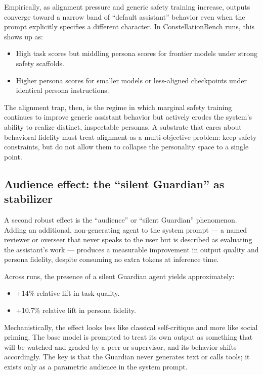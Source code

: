 Empirically, as alignment pressure and generic safety training increase,
outputs converge toward a narrow band of ``default assistant'' behavior
even when the prompt explicitly specifies a different character. In
ConstellationBench runs, this shows up as:

\begin{itemize}
\tightlist
\item
  High task scores but middling persona scores for frontier models under
  strong safety scaffolds.
\item
  Higher persona scores for smaller models or less-aligned checkpoints
  under identical persona instructions.
\end{itemize}

The alignment trap, then, is the regime in which marginal safety
training continues to improve generic assistant behavior but actively
erodes the system's ability to realize distinct, inspectable personas. A
substrate that cares about behavioral fidelity must treat alignment as a
multi-objective problem: keep safety constraints, but do not allow them
to collapse the personality space to a single point.

\subsection{Audience effect: the ``silent Guardian'' as
stabilizer}\label{audience-effect-the-silent-guardian-as-stabilizer}

A second robust effect is the ``audience'' or ``silent Guardian''
phenomenon. Adding an additional, non-generating agent to the system
prompt --- a named reviewer or overseer that never speaks to the user
but is described as evaluating the assistant's work --- produces a
measurable improvement in output quality and persona fidelity, despite
consuming no extra tokens at inference time.

Across runs, the presence of a silent Guardian agent yields
approximately:

\begin{itemize}
\tightlist
\item
  +14\% relative lift in task quality.
\item
  +10.7\% relative lift in persona fidelity.
\end{itemize}

Mechanistically, the effect looks less like classical self-critique and
more like social priming. The base model is prompted to treat its own
output as something that will be watched and graded by a peer or
supervisor, and its behavior shifts accordingly. The key is that the
Guardian never generates text or calls tools; it exists only as a
parametric audience in the system prompt.

